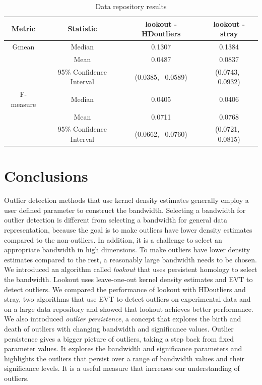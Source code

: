 \documentclass[11pt,a4paper,]{article}
\theoremstyle{definition}
\theoremstyle{definition}
\theoremstyle{definition}
\theoremstyle{remark}
\begin{document}
\begin{table}[!t]
    \centering
    \caption{Data repository results}
    \footnotesize
    \begin{tabular}{cccc}
        \toprule
    Metric & Statistic & lookout - HDoutliers & lookout - stray \\ \midrule
           Gmean    & Median                    & 0.1307    & 0.1384 \\
                    & Mean                      & 0.0487    & 0.0837 \\
                    & 95\% Confidence Interval & (0.0385, \, 0.0589) &  (0.0743, \, 0.0932) \\
                   \midrule 
        F-measure   & Median                   & 0.0405     & 0.0406  \\  
                    & Mean                     & 0.0711     & 0.0768  \\     
                    & 95\% Confidence Interval & (0.0662, \,  0.0760) &  (0.0721, \,  0.0815)\\
           \bottomrule
    \end{tabular}
    \label{tab:dataRepository}
\end{table}

\hypertarget{conclusions}{%
\section{\texorpdfstring{Conclusions \label{sec:conclusions}}{Conclusions }}\label{conclusions}}

Outlier detection methods that use kernel density estimates generally employ a user defined parameter to construct the bandwidth. Selecting a bandwidth for outlier detection is different from selecting a bandwidth for general data representation, because the goal is to make outliers have lower density estimates compared to the non-outliers. In addition, it is a challenge to select an appropriate bandwidth in high dimensions. To make outliers have lower density estimates compared to the rest, a reasonably large bandwidth needs to be chosen. We introduced an algorithm called \emph{lookout} that uses persistent homology to select the bandwidth. Lookout uses leave-one-out kernel density estimates and EVT to detect outliers. We compared the performance of lookout with HDoutliers and stray, two algorithms that use EVT to detect outliers on experimental data and on a large data repository and showed that lookout achieves better performance.
We also introduced \emph{outlier persistence}, a concept that explores the birth and death of outliers with changing bandwidth and significance values. Outlier persistence gives a bigger picture of outliers, taking a step back from fixed parameter values. It explores the bandwidth and significance parameters and highlights the outliers that persist over a range of bandwidth values and their significance levels. It is a useful measure that increases our understanding of outliers.
\end{document}
